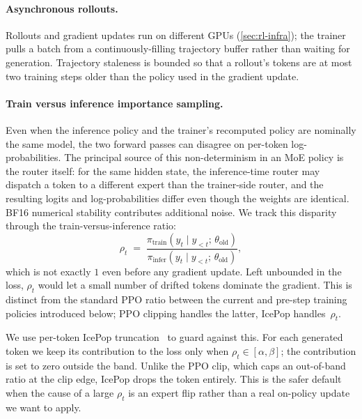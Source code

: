\documentclass[11pt,a4paper]{article}
\begin{document}
\paragraph{Asynchronous rollouts.}
Rollouts and gradient updates run on different GPUs
(\cref{sec:rl-infra}); the trainer pulls a batch from a
continuously-filling trajectory buffer rather than waiting for
generation. Trajectory staleness is bounded so that a rollout's tokens
are at most two training steps older than the policy used in the
gradient update.

\paragraph{Train versus inference importance sampling.}
Even when the inference policy and the trainer's recomputed policy are
nominally the same model, the two forward passes can disagree on
per-token log-probabilities. The principal source of this non-determinism in
an MoE policy is the router itself: for the same hidden state, the inference-time
router may dispatch a token to a different expert than the trainer-side
router, and the resulting logits and log-probabilities
differ even though the weights are identical. BF16 numerical stability contributes
additional noise. We track this disparity through the train-versus-inference
ratio:
\begin{equation*}
  \rho_t \;=\; \frac{\pi_\text{train}(y_t \mid y_{<t};\, \theta_\text{old})}
                    {\pi_\text{infer}(y_t \mid y_{<t};\, \theta_\text{old})},
\end{equation*}
which is not exactly $1$ even before any gradient update. Left
unbounded in the loss, $\rho_t$ would let a small number of drifted
tokens dominate the gradient. This is distinct from the standard PPO
ratio between the current and pre-step training policies introduced
below; PPO clipping handles the latter, IcePop handles~$\rho_t$.

We use per-token IcePop truncation~\cite{ring1t} to guard against this.
For each generated token we keep its contribution to the loss only when
$\rho_t \in [\alpha, \beta]$; the contribution is set to zero outside
the band. Unlike the PPO clip, which caps an out-of-band ratio at the
clip edge, IcePop drops the token entirely. This is the safer default
when the cause of a large $\rho_t$ is an expert flip rather than a real
on-policy update we want to apply.
\end{document}
